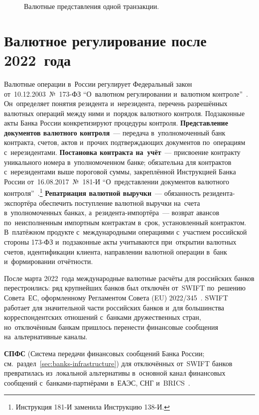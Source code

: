 \vspace{-2pt}
\begin{figure}[htbp]
  \centering
  \caption{Валютные представления одной транзакции.}\label{fig:multicurrency-recon}
\end{figure}

\section{Валютное регулирование после 2022~года}\label{sec:mc-russia}

Валютные операции в~России регулирует Федеральный закон от~10.12.2003~№~173-ФЗ
\enquote{О~валютном регулировании и~валютном контроле}~\cite{fz-173}.
Он~определяет понятия резидента и~нерезидента, перечень разрешённых валютных
операций между ними и~порядок валютного контроля. Подзаконные акты Банка России
конкретизируют процедуры контроля. \textbf{Представление документов валютного
контроля}~--- передача в~уполномоченный банк контракта, счетов, актов и~прочих
подтверждающих документов по~операциям с~нерезидентами. \textbf{Постановка
контракта на~учёт}~--- присвоение контракту уникального номера в~упол\-номоченном
банке; обязательна для контрактов с~нерезидентами выше пороговой суммы,
закреплённой Инструкцией Банка России от~16.08.2017~№~181-И
\enquote{О~представлении документов валютного
контроля}~\cite{cbr-181i}.\footnote{Инструкция 181-И заменила Инструкцию
138-И.}
\textbf{Репатриация валютной выручки}~--- обязанность резидента-экспортёра
обеспечить поступление валютной выручки на~счета в~уполномоченных банках,
а~резидента-импортёра~--- возврат авансов по~неисполненным импортным контрактам
в~срок, установленный контрактом. В~платёжном продукте с~международными
операциями с~участием российской стороны 173-ФЗ и~подзаконные акты учитываются
при~открытии валютных счетов, идентификации клиента, направлении валютной
операции в~банк и~формировании отчётности.

После марта 2022~года международные валютные расчёты для российских банков
перестроились: ряд крупнейших банков был отключён от~SWIFT по~решению
Совета~ЕС, оформленному Регламентом Совета (EU)
2022/345~\cite{eu-swift-russia-2022,ofac-russia-sanctions}. SWIFT работает для
значительной части российских банков и~для большинства корреспондентских
отношений с~банками дружественных стран, но~отключённым банкам пришлось
перенести финансовые сообщения на~альтернативные каналы.

\textbf{СПФС} (Система передачи финансовых сообщений Банка России;
см.~раздел~\ref{sec:banks-infrastructure}) для отключённых от~SWIFT банков
превратилась из~локальной альтернативы в~основной канал финансовых сообщений
с~банками-партнёрами в~ЕАЭС, СНГ и~BRICS~\cite{cbr-spfs}.

